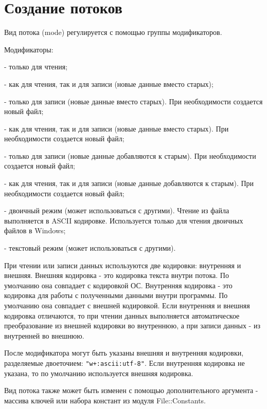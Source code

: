 \hypertarget{appio}{}
\chapter{Создание потоков}

Вид потока (mode) регулируется с помощью группы модификаторов.

\begin{keylist}{Модификаторы:}
  
   - только для чтения; 
  
   - как для чтения, так и для записи (новые данные вместо старых); 
  
   - только для записи (новые данные вместо старых). При необходимости создается новый файл; 
  
   - как для чтения, так и для записи (новые данные вместо старых). При необходимости создается новый файл; 
  
   - только для записи (новые данные добавляются к старым). При необходимости создается новый файл; 
  
   - как для чтения, так и для записи (новые данные добавляются к старым). При необходимости создается новый файл; 
  
   - двоичный режим (может использоваться с другими). Чтение из файла выполняется в ASCII кодировке. Используется только для чтения двоичных файлов в Windows; 
  
   - текстовый режим (может использоваться с другими).
\end{keylist}

При чтении или записи данных используются две кодировки: внутренняя и внешняя. Внешняя кодировка - это кодировка текста внутри потока. По умолчанию она совпадает с кодировкой ОС. Внутренняя кодировка - это кодировка для работы с полученными данными внутри программы. По умолчанию она совпадает с внешней кодировкой. Если внутренняя и внешняя кодировка отличаются, то при чтении данных выполняется автоматическое преобразование из внешней кодировки во внутреннюю, а при записи данных - из внутренней во внешнюю.

После модификатора могут быть указаны внешняя и внутренняя кодировки, разделяемые двоеточием: \verb!"w+:ascii:utf-8"!. Если внутренняя кодировка не указана, то по умолчанию используется внешняя кодировка.

Вид потока также может быть изменен с помощью дополнительного аргумента - массива ключей или набора констант из модуля File::Constants.

